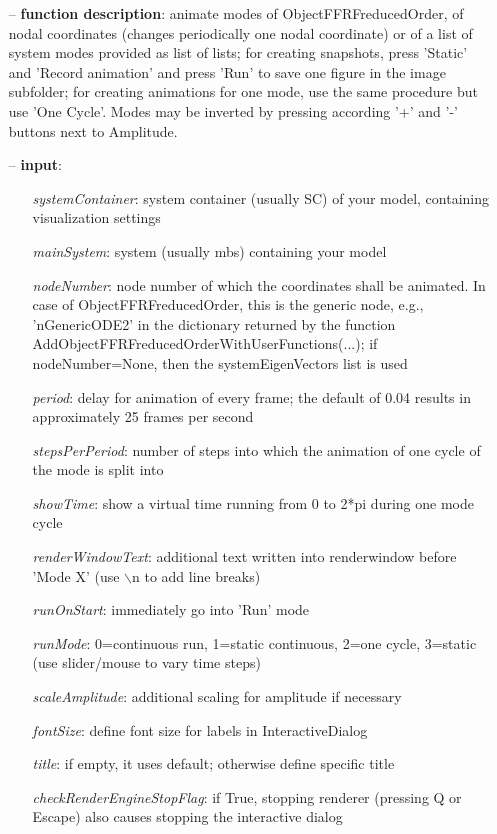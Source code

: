 \begin{itemize}[leftmargin=1.4cm]
\begin{itemize}[leftmargin=1.4cm]
\begin{itemize}[leftmargin=1.4cm]
\begin{itemize}[leftmargin=0.5cm]
\begin{itemize}[leftmargin=1.4cm]
\begin{itemize}[leftmargin=1.4cm]
\begin{itemize}[leftmargin=0.5cm]
\begin{itemize}[leftmargin=1.4cm]
\begin{itemize}[leftmargin=0.5cm]
\begin{itemize}[leftmargin=1.4cm]
\begin{itemize}[leftmargin=1.4cm]
\begin{itemize}[leftmargin=0.7cm]
\item[--]
{\bf function description}: animate modes of ObjectFFRFreducedOrder, of nodal coordinates (changes periodically one nodal coordinate) or of a list of system modes provided as list of lists; for creating snapshots, press 'Static' and 'Record animation' and press 'Run' to save one figure in the image subfolder; for creating animations for one mode, use the same procedure but use 'One Cycle'. Modes may be inverted by pressing according '+' and '-' buttons next to Amplitude.
\item[--]
{\bf input}: \vspace{-6pt}
\begin{itemize}[leftmargin=1.2cm]
\setlength{\itemindent}{-0.7cm}
\item[]{\it systemContainer}: system container (usually SC) of your model, containing visualization settings
\item[]{\it mainSystem}: system (usually mbs) containing your model
\item[]{\it nodeNumber}: node number of which the coordinates shall be animated. In case of ObjectFFRFreducedOrder, this is the generic node, e.g., 'nGenericODE2' in the dictionary returned by the function AddObjectFFRFreducedOrderWithUserFunctions(...); if nodeNumber=None, then the systemEigenVectors list is used
\item[]{\it period}: delay for animation of every frame; the default of 0.04 results in approximately 25 frames per second
\item[]{\it stepsPerPeriod}: number of steps into which the animation of one cycle of the mode is split into
\item[]{\it showTime}: show a virtual time running from 0 to 2*pi during one mode cycle
\item[]{\it renderWindowText}: additional text written into renderwindow before 'Mode X' (use $\backslash$n to add line breaks)
\item[]{\it runOnStart}: immediately go into 'Run' mode
\item[]{\it runMode}: 0=continuous run, 1=static continuous, 2=one cycle, 3=static (use slider/mouse to vary time steps)
\item[]{\it scaleAmplitude}: additional scaling for amplitude if necessary
\item[]{\it fontSize}: define font size for labels in InteractiveDialog
\item[]{\it title}: if empty, it uses default; otherwise define specific title
\item[]{\it checkRenderEngineStopFlag}: if True, stopping renderer (pressing Q or Escape) also causes stopping the interactive dialog

\end{itemize}
\end{itemize}
\end{itemize}
\end{itemize}
\end{itemize}
\end{itemize}
\end{itemize}
\end{itemize}
\end{itemize}
\end{itemize}
\end{itemize}
\end{itemize}
\end{itemize}
